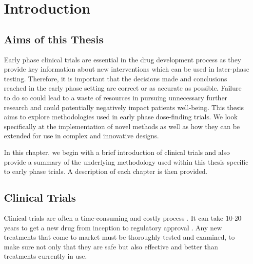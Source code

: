 
\chapter{Introduction} %

\label{Intro} %

\section{Aims of this Thesis}
Early phase clinical trials are essential in the drug development process as they provide key information about new interventions which can be used in later-phase testing. Therefore, it is important that the decisions made and conclusions reached in the early phase setting are correct or as accurate as possible. Failure to do so could lead to a waste of resources in pursuing unnecessary further research and could potentially negatively impact patients well-being. This thesis aims to explore methodologies used in early phase dose-finding trials. We look specifically at the implementation of novel methods as well as how they can be extended for use in complex and innovative designs. 

In this chapter, we begin with a brief introduction of clinical trials and also provide a summary of the underlying methodology used within this thesis specific to early phase trials. A description of each chapter is then provided. 

\section{Clinical Trials}

Clinical trials are often a time-consuming and costly process \cite{fogelFactorsAssociatedClinical2018}. It can take 10-20 years to get a new drug from inception to regulatory approval \cite{lipskyIdeaMarketDrug2001, mohsDrugDiscoveryDevelopment2017}. Any new treatments that come to market must be thoroughly tested and examined, to make sure not only that they are safe but also effective and better than treatments currently in use.

